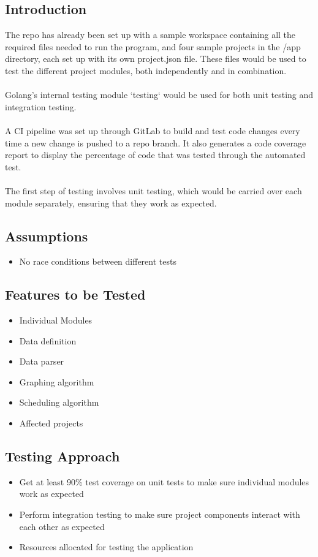 \documentclass[11pt]{article}
\begin{document}
\subsection{Introduction}
The repo has already been set up with a sample workspace containing all the required files needed to run the program, and  four sample projects in the /app directory, each set up with its own project.json file. These files would be used to test the different project modules, both independently and in combination. \\
\\
Golang’s internal testing module `testing` would be used for both unit testing and integration testing. \\
\\
A CI pipeline was set up through GitLab to build and test code changes every time a new change is pushed to a repo branch. It also generates a code coverage report to display the percentage of code that was tested through the automated test. \\
\\
The first step of testing involves unit testing, which would be carried over each module separately, ensuring that they work as expected. \\
\subsection{Assumptions}


\begin{itemize}
    \item No race conditions between different tests
\end{itemize}

\subsection{Features to be Tested}
\begin{itemize}
    \item Individual Modules
    \item Data definition
    \item Data parser
    \item Graphing algorithm
    \item Scheduling algorithm
    \item Affected projects
\end{itemize}

\subsection{Testing Approach}
\begin{itemize}
    \item Get at least 90\% test coverage on unit tests to make sure individual modules work as expected
    \item Perform integration testing to make sure project components interact with each other as expected
    \item Resources allocated for testing the application
\end{itemize}
\end{document}
